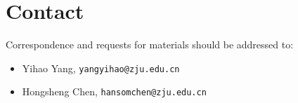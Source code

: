 \documentclass[11pt]{article}
\begin{document}
\section*{Contact}

Correspondence and requests for materials should be addressed to:

\begin{itemize}[leftmargin=1.5em]
  \item Yihao Yang, \texttt{yangyihao@zju.edu.cn}
  \item Hongsheng Chen, \texttt{hansomchen@zju.edu.cn}
\end{itemize}
\end{document}
